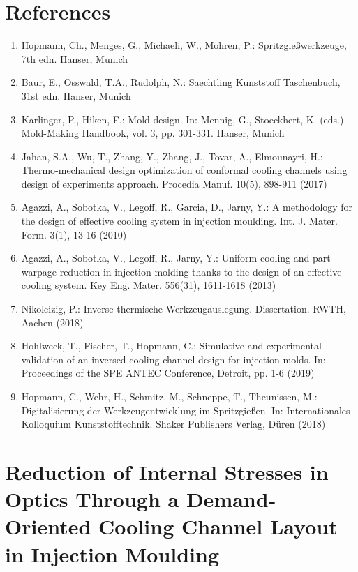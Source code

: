 \documentclass[10pt]{article}
\begin{document}
\section*{References}
\begin{enumerate}
  \item Hopmann, Ch., Menges, G., Michaeli, W., Mohren, P.: Spritzgießwerkzeuge, 7th edn. Hanser, Munich

  \item Baur, E., Osswald, T.A., Rudolph, N.: Saechtling Kunststoff Taschenbuch, 31st edn. Hanser, Munich

  \item Karlinger, P., Hiken, F.: Mold design. In: Mennig, G., Stoeckhert, K. (eds.) Mold-Making Handbook, vol. 3, pp. 301-331. Hanser, Munich

  \item Jahan, S.A., Wu, T., Zhang, Y., Zhang, J., Tovar, A., Elmounayri, H.: Thermo-mechanical design optimization of conformal cooling channels using design of experiments approach. Procedia Manuf. 10(5), 898-911 (2017)

  \item Agazzi, A., Sobotka, V., Legoff, R., Garcia, D., Jarny, Y.: A methodology for the design of effective cooling system in injection moulding. Int. J. Mater. Form. 3(1), 13-16 (2010)

  \item Agazzi, A., Sobotka, V., Legoff, R., Jarny, Y.: Uniform cooling and part warpage reduction in injection molding thanks to the design of an effective cooling system. Key Eng. Mater. 556(31), 1611-1618 (2013)

  \item Nikoleizig, P.: Inverse thermische Werkzeugauslegung. Dissertation. RWTH, Aachen (2018)

  \item Hohlweck, T., Fischer, T., Hopmann, C.: Simulative and experimental validation of an inversed cooling channel design for injection molds. In: Proceedings of the SPE ANTEC Conference, Detroit, pp. 1-6 (2019)

  \item Hopmann, C., Wehr, H., Schmitz, M., Schneppe, T., Theunissen, M.: Digitalisierung der Werkzeugentwicklung im Spritzgießen. In: Internationales Kolloquium Kunststofftechnik. Shaker Publishers Verlag, Düren (2018)

\end{enumerate}

\section*{Reduction of Internal Stresses in Optics Through a Demand-Oriented Cooling Channel Layout in Injection Moulding }
\end{document}
